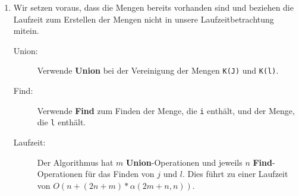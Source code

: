 \documentclass[a4paper,10pt]{article}
\begin{document}
\begin{enumerate}
\item 
Wir setzen voraus, dass die Mengen bereits vorhanden sind und beziehen die Laufzeit zum Erstellen der Mengen nicht in unsere Laufzeitbetrachtung mitein.  
    \begin{description}
	\item[Union:] Verwende \textbf{Union} bei der Vereinigung der Mengen \texttt{K(J)} und \texttt{K(l)}.
	\item[Find:] Verwende \textbf{Find} zum Finden der Menge, die \texttt{i} enthält, und der Menge, die \texttt{l} enthält.
	\item[Laufzeit:] Der Algorithmus hat $m$ \textbf{Union}-Operationen und jeweils $n$ \textbf{Find}-Operationen für das Finden von $j$ und $l$. Dies führt zu einer Laufzeit von $O(n+(2n+m)*\alpha(2m+n, n))$.
	\end{description}
\end{enumerate}
\end{document}
